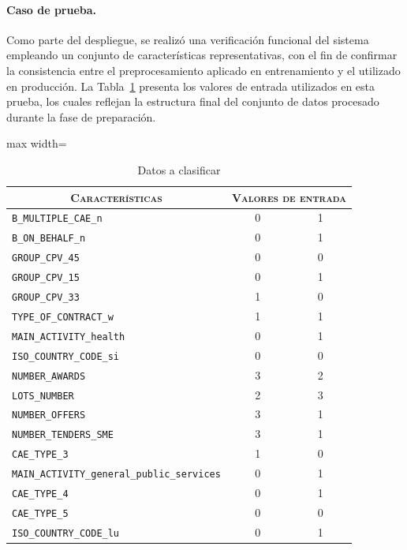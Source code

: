 \documentclass[a4paper,fleqn]{cas-sc}
\begin{document}
	
	
	\paragraph{\textbf{Caso de prueba.}}
	
	Como parte del despliegue, se realizó una verificación funcional del sistema empleando un conjunto de características representativas, con el fin de confirmar la consistencia entre el preprocesamiento aplicado en entrenamiento y el utilizado en producción. La Tabla~\ref{tab:datos_prediccion} presenta los valores de entrada utilizados en esta prueba, los cuales reflejan la estructura final del conjunto de datos procesado durante la fase de preparación.
	

\begin{table}[t]
	\small
	\setlength{\tabcolsep}{7pt}
	\renewcommand{\arraystretch}{1.2} %
	\caption{Datos a clasificar}
	\label{tab:datos_prediccion}
	\centering		
	\begin{adjustbox}{max width=\textwidth}		
		\begin{tabular}{lcc}
			\hline
			\multicolumn{1}{c}{\textbf{\textsc{Características}}} & \multicolumn{2}{c}{\textbf{\textsc{Valores de entrada}}} \\ \hline
			\texttt{B\_MULTIPLE\_CAE\_n} & 0 & 1 \\ 
			\texttt{B\_ON\_BEHALF\_n} & 0 & 1 \\ 
			\texttt{GROUP\_CPV\_45} & 0 & 0 \\ 
			\texttt{GROUP\_CPV\_15} & 0 & 1 \\ 
			\texttt{GROUP\_CPV\_33} & 1 & 0 \\ 
			\texttt{TYPE\_OF\_CONTRACT\_w} & 1 & 1 \\ 
			\texttt{MAIN\_ACTIVITY\_health} & 0 & 1 \\ 
			\texttt{ISO\_COUNTRY\_CODE\_si} & 0 & 0 \\ 
			\texttt{NUMBER\_AWARDS} & 3 & 2 \\ 
			\texttt{LOTS\_NUMBER} & 2 & 3 \\ 
			\texttt{NUMBER\_OFFERS} & 3 & 1 \\ 
			\texttt{NUMBER\_TENDERS\_SME} & 3 & 1 \\ 
			\texttt{CAE\_TYPE\_3} & 1 & 0 \\ 
			\texttt{MAIN\_ACTIVITY\_general\_public\_services} & 0 & 1 \\ 
			\texttt{CAE\_TYPE\_4} & 0 & 1 \\ 
			\texttt{CAE\_TYPE\_5} & 0 & 0 \\ 
			\texttt{ISO\_COUNTRY\_CODE\_lu} & 0 & 1 \\ \hline
		\end{tabular}
	\end{adjustbox}
\end{table}
\end{document}
